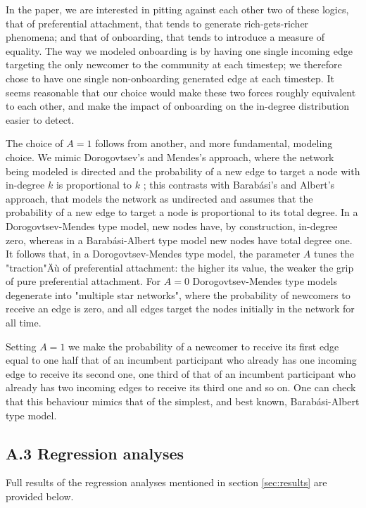 \documentclass{nws}
\begin{document}
In the paper, we are interested in pitting against each other two of these logics, that of preferential attachment, that tends to generate rich-gets-richer phenomena; and that of onboarding, that tends to introduce a measure of equality. The way we modeled onboarding is by having one single incoming edge targeting the only newcomer to the community at each timestep; we therefore chose to have one single non-onboarding generated edge at each timestep. It seems reasonable that our choice would make  these two forces roughly equivalent to each other, and make the impact of onboarding on the in-degree distribution easier to detect.

The choice of $A=1$ follows from another, and more fundamental, modeling choice. We mimic Dorogovtsev's and Mendes's approach, where the network being modeled is directed and the probability of a new edge to target a node with in-degree $k$ is proportional to $k$ \cite{dorogovtsev2002evolution}; this contrasts with Barab\'asi's and Albert's approach, that models the network as undirected and assumes that the probability of a new edge to target a node is proportional to its total degree. In a Dorogovtsev-Mendes type model, new nodes have, by construction, in-degree zero, whereas in a Barab\'asi-Albert type model new nodes have total degree one. It follows that, in a Dorogovtsev-Mendes type model, the parameter $A$ tunes the "traction"Äù of preferential attachment: the higher its value, the weaker the grip of pure preferential attachment. For $A=0$ Dorogovtsev-Mendes type models degenerate into "multiple star networks", where the probability of newcomers to receive an edge is zero, and all edges target the nodes initially in the network for all time. 

Setting $A = 1$ we make the probability of a newcomer to receive its first edge equal to one half that of an incumbent participant who already has one incoming edge to receive its second one, one third of that of an incumbent participant who already has two incoming edges to receive its third one and so on. One can check that this behaviour mimics that of the simplest, and best known, Barab\'asi-Albert type model. 

\subsection*{A.3 Regression analyses}

Full results of the regression analyses mentioned in section \ref{sec:results} are provided below.
\end{document}
